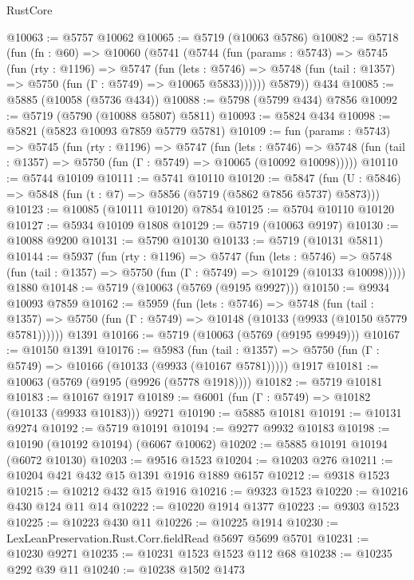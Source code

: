 \begin{lexlean}{RustCore}
\begin{coremodule}
@10063 := @5757 @10062
@10065 := @5719 (@10063 @5786)
@10082 := @5718
    (fun (fn : @60) =>
    @10060
      (@5741
        (@5744
          (fun (params : @5743) =>
          @5745
            (fun (rty : @1196) =>
            @5747
              (fun (lets : @5746) =>
              @5748 (fun (tail : @1357) => @5750 (fun (Γ : @5749) => @10065 @5833))))))
        @5879))
    @434
@10085 := @5885 (@10058 (@5736 @434))
@10088 := @5798 (@5799 @434) @7856
@10092 := @5719 (@5790 (@10088 @5807) @5811)
@10093 := @5824 @434
@10098 := @5821 (@5823 @10093 @7859 @5779 @5781)
@10109 := fun (params : @5743) =>
  @5745
    (fun (rty : @1196) =>
    @5747
      (fun (lets : @5746) =>
      @5748 (fun (tail : @1357) => @5750 (fun (Γ : @5749) => @10065 (@10092 @10098)))))
@10110 := @5744 @10109
@10111 := @5741 @10110
@10120 := @5847 (fun (U : @5846) => @5848 (fun (t : @7) => @5856 (@5719 (@5862 @7856 @5737) @5873)))
@10123 := @10085 (@10111 @10120) @7854
@10125 := @5704 @10110 @10120
@10127 := @5934 @10109 @1808
@10129 := @5719 (@10063 @9197)
@10130 := @10088 @9200
@10131 := @5790 @10130
@10133 := @5719 (@10131 @5811)
@10144 := @5937
    (fun (rty : @1196) =>
    @5747
      (fun (lets : @5746) =>
      @5748 (fun (tail : @1357) => @5750 (fun (Γ : @5749) => @10129 (@10133 @10098)))))
    @1880
@10148 := @5719 (@10063 (@5769 (@9195 @9927)))
@10150 := @9934 @10093 @7859
@10162 := @5959
    (fun (lets : @5746) =>
    @5748
      (fun (tail : @1357) =>
      @5750 (fun (Γ : @5749) => @10148 (@10133 (@9933 (@10150 @5779 @5781))))))
    @1391
@10166 := @5719 (@10063 (@5769 (@9195 @9949)))
@10167 := @10150 @1391
@10176 := @5983
    (fun (tail : @1357) => @5750 (fun (Γ : @5749) => @10166 (@10133 (@9933 (@10167 @5781)))))
    @1917
@10181 := @10063 (@5769 (@9195 (@9926 (@5778 @1918))))
@10182 := @5719 @10181
@10183 := @10167 @1917
@10189 := @6001 (fun (Γ : @5749) => @10182 (@10133 (@9933 @10183))) @9271
@10190 := @5885 @10181
@10191 := @10131 @9274
@10192 := @5719 @10191
@10194 := @9277 @9932 @10183
@10198 := @10190 (@10192 @10194) (@6067 @10062)
@10202 := @5885 @10191 @10194 (@6072 @10130)
@10203 := @9516 @1523
@10204 := @10203 @276
@10211 := @10204 @421 @432 @15 @1391 @1916 @1889 @6157
@10212 := @9318 @1523
@10215 := @10212 @432 @15 @1916
@10216 := @9323 @1523
@10220 := @10216 @430 @124 @11 @14
@10222 := @10220 @1914 @1377
@10223 := @9303 @1523
@10225 := @10223 @430 @11
@10226 := @10225 @1914
@10230 := LexLeanPreservation.Rust.Corr.fieldRead @5697 @5699 @5701
@10231 := @10230 @9271
@10235 := @10231 @1523 @1523 @112 @68
@10238 := @10235 @292 @39 @11
@10240 := @10238 @1502 @1473

\end{coremodule}
\end{lexlean}
